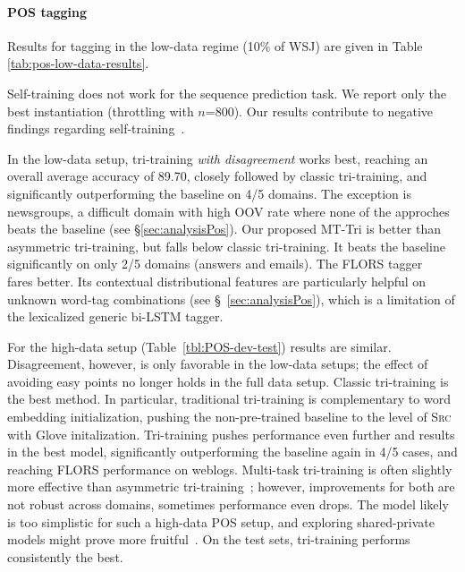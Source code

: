 \documentclass[11pt,a4paper]{article}
\begin{document}
\paragraph{POS tagging} Results for tagging in the low-data regime (10\% of WSJ) are given in Table \ref{tab:pos-low-data-results}.

Self-training does not work for the sequence prediction task. We report only the best instantiation (throttling with $n$=800). Our results contribute to  negative findings regarding self-training~\cite{Plank2011,VanAsch2016}.

In the low-data setup, tri-training \textit{with disagreement} works best, reaching an overall average accuracy of 89.70, closely followed by classic tri-training, and significantly outperforming the baseline on 4/5 domains. The exception is newsgroups, a difficult domain with high OOV rate where none of the approches beats the baseline (see \S \ref{sec:analysisPos}). Our proposed MT-Tri is better than asymmetric tri-training, but falls below classic tri-training. It beats the baseline significantly on only 2/5 domains (answers and emails). The FLORS tagger~\cite{yin-schnabel-schutze:2015:EMNLP} fares better. Its contextual distributional features are particularly helpful on unknown word-tag combinations (see \S~\ref{sec:analysisPos}), which is a limitation of the lexicalized generic bi-LSTM tagger.

For the high-data setup (Table~\ref{tbl:POS-dev-test}) results are similar. Disagreement, however, is only favorable in the low-data setups; the effect of avoiding easy points no longer holds in the full data setup. Classic tri-training is the best method. In particular, traditional tri-training is complementary to word embedding initialization, pushing the non-pre-trained baseline to the level of \textsc{Src} with Glove initalization. Tri-training pushes performance even further and results in the best model, significantly outperforming the baseline again in 4/5 cases, and reaching FLORS performance on weblogs. Multi-task tri-training is often slightly more effective than asymmetric tri-training~\cite{Saito2017}; however, improvements for both are not robust across domains, sometimes performance even drops. The model likely is too simplistic for such a high-data POS setup, and exploring shared-private models might prove more fruitful~\cite{Liu:ea:2017:ACL}. On the test sets, tri-training performs consistently the best. 
\end{document}
